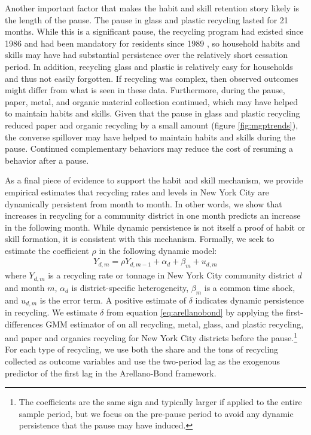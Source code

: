 \documentclass[12pt]{article}
\begin{document}
Another important factor that makes the habit and skill retention story likely is the length of the pause. 
 The pause in glass and plastic recycling lasted for 21 months.  While this is a significant pause, the recycling program had existed since 1986 and had been mandatory for residents since 1989 \citep{lubasch1989,macbride2004}, so household habits and skills may have had substantial persistence over the relatively short cessation period.  In addition, recycling glass and plastic is relatively easy for households and thus not easily forgotten.  If recycling was complex, then observed outcomes might differ from what is seen in these data.  Furthermore, during the pause, paper, metal, and organic material collection continued, which may have helped to maintain habits and skills.  Given that the pause in glass and plastic recycling reduced paper and organic recycling by a small amount (figure \ref{fig:mgptrends}), the converse spillover may have helped to maintain habits and skills during the pause.  Continued complementary behaviors may reduce the cost of resuming a behavior after a pause.

As a final piece of evidence to support the habit and skill mechanism, we provide empirical estimates that recycling rates and levels in New York City are dynamically persistent from month to month.  In other words, we show that increases in recycling for a community district in one month predicts an increase in the following month.  While dynamic persistence is not itself a proof of habit or skill formation, it is consistent with this mechanism.  Formally, we seek to estimate the coefficient \(\rho\) in the following dynamic model:
\begin{align} \label{eq:arellanobond}
    Y_{d,m} = \rho Y_{d,m-1} + \alpha_d + \beta_m + u_{d,m}
\end{align}
where \(Y_{d,m}\) is a recycling rate or tonnage in New York City community district \(d\) and month \(m\), \(\alpha_d\) is district-specific heterogeneity, \(\beta_m\) is a common time shock, and \(u_{d,m}\) is the error term.  A positive estimate of \(\delta\) indicates dynamic persistence in recycling.  We estimate \(\delta\) from equation \ref{eq:arellanobond} by applying the first-differences GMM estimator of \cite{arellanobond1991} on all recycling, metal, glass, and plastic recycling, and paper and organics recycling for New York City districts before the pause.\footnote{The coefficients are the same sign and typically larger if applied to the entire sample period, but we focus on the pre-pause period to avoid any dynamic persistence that the pause may have induced.}  For each type of recycling, we use both the share and the tons of recycling collected as outcome variables and use the two-period lag as the exogenous predictor of the first lag in the Arellano-Bond framework.
\end{document}
